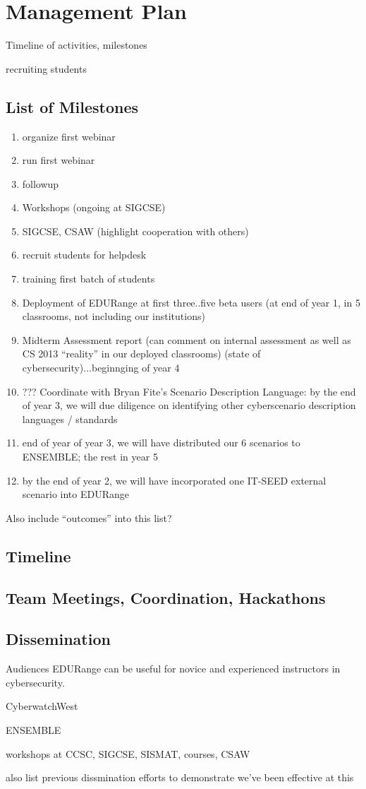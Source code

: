 \section*{Management Plan}

Timeline of activities, milestones

recruiting students



\subsection*{List of Milestones}

\begin{enumerate}
 \item organize first webinar
 \item run first webinar
 \item followup
 \item Workshops (ongoing at SIGCSE)
 \item SIGCSE, CSAW (highlight cooperation with others)
 \item recruit students for helpdesk
 \item training first batch of students
 \item Deployment of EDURange at first three..five beta users (at end of year 1, in 5 classrooms, not including our institutions)
 \item Midterm Assessment report (can comment on internal assessment as well as CS 2013 ``reality'' in our deployed classrooms)
        (state of cybersecurity)...beginnging of year 4
 \item ??? Coordinate with Bryan Fite's Scenario Description Language: by the end of year 3, we will due diligence on identifying
       other cyberscenario description languages / standards  
 \item end of year of year 3, we will have distributed our 6 scenarios to ENSEMBLE; the rest in year 5
 \item by the end of year 2, we will have incorporated one IT-SEED external scenario into EDURange
\end{enumerate}

Also include ``outcomes'' into this list?

\subsection*{Timeline}

\subsection*{Team Meetings, Coordination, Hackathons}



\subsection*{Dissemination}

Audiences
EDURange can be useful for novice and experienced instructors in cybersecurity.

CyberwatchWest

ENSEMBLE

workshops at CCSC, SIGCSE, SISMAT, courses, CSAW

also list previous dissmination efforts to demonstrate we've been effective at this
